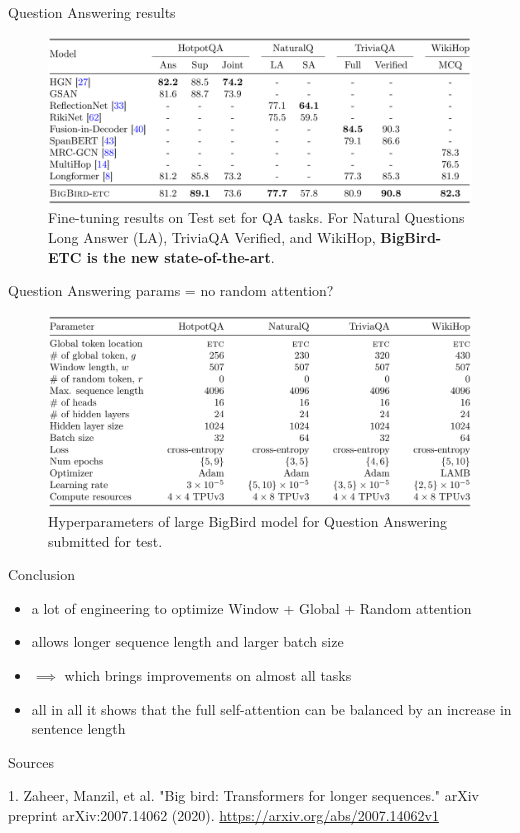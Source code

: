 \documentclass{beamer}
\begin{document}
\begin{frame}{Question Answering results}
\begin{figure}[h]
\includegraphics[width=\textwidth]{img/qa_res}
\caption{Fine-tuning results on Test set for QA tasks. For Natural Questions Long Answer (LA), TriviaQA Verified, and WikiHop, \textbf{BigBird-ETC is the new state-of-the-art}.}
\end{figure}
\end{frame}
\begin{frame}{Question Answering params = no random attention?}
\begin{figure}[h]
\includegraphics[width=\textwidth]{img/qa_params}
\caption{Hyperparameters of large BigBird model for Question Answering submitted for test.}
\end{figure}
\end{frame}
\begin{frame}{Conclusion}
\begin{itemize}
\item a lot of engineering to optimize Window + Global + Random attention
\item allows longer sequence length and larger batch size
\item $\implies$ which brings improvements on almost all tasks
\item all in all it shows that the full self-attention can be balanced by an increase in sentence length
\end{itemize}
\end{frame}

\begin{frame}{Sources}
\begin{thebibliography}{0}

   1. Zaheer, Manzil, et al. "Big bird: Transformers for longer sequences." arXiv preprint arXiv:2007.14062 (2020). \url{https://arxiv.org/abs/2007.14062v1} 

  
\end{thebibliography}
\end{frame} 
\end{document}
